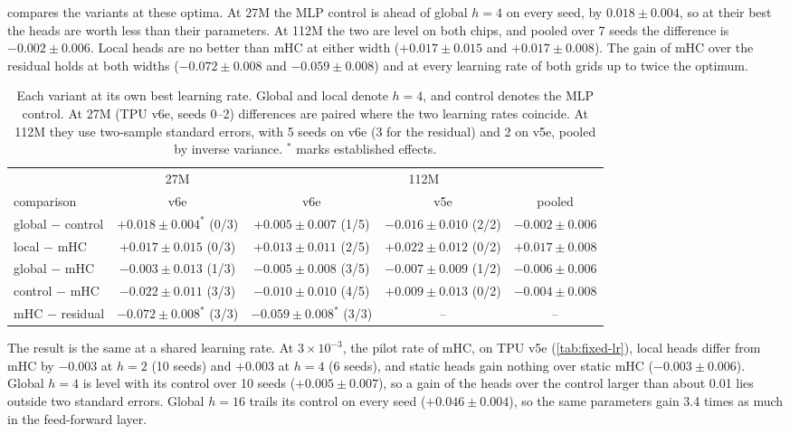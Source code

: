\documentclass[11pt, a4paper]{article}
\newcommand{\lr}[1]{\ensuremath{#1 \times 10^{-3}}}
\newcommand{\est}{^{\ast}}
\begin{document}
 compares the variants at these optima. At 27M the MLP control is ahead of global $h = 4$ on every seed, by
$0.018 \pm 0.004$, so at their best the heads are worth less than their parameters. At 112M the two are level on both chips, and
pooled over 7 seeds the difference is $-0.002 \pm 0.006$. Local heads are no better than mHC at either width ($+0.017 \pm 0.015$ and
$+0.017 \pm 0.008$). The gain of mHC over the residual holds at both widths ($-0.072 \pm 0.008$ and $-0.059 \pm 0.008$) and at every
learning rate of both grids up to twice the optimum.

\begin{table}[ht]
  \centering
  \caption{Each variant at its own best learning rate. Global and local denote $h = 4$, and control denotes the MLP control. At 27M
    (TPU v6e, seeds 0--2) differences are paired where the two learning rates coincide. At 112M they use two-sample standard errors,
    with 5 seeds on v6e (3 for the residual) and 2 on v5e, pooled by inverse variance. $\est$ marks established effects.}
  \label{tab:best-lr}
  \small
  \setlength{\tabcolsep}{4pt}
  \begin{tabular}{lcccc}
    \toprule
    & 27M & \multicolumn{3}{c}{112M} \\
    \cmidrule(lr){2-2} \cmidrule(lr){3-5}
    comparison & v6e & v6e & v5e & pooled \\
    \midrule
    global $-$ control & $+0.018 \pm 0.004\est$ (0/3) & $+0.005 \pm 0.007$ (1/5) & $-0.016 \pm 0.010$ (2/2) & $-0.002 \pm 0.006$ \\
    local $-$ mHC & $+0.017 \pm 0.015$ (0/3) & $+0.013 \pm 0.011$ (2/5) & $+0.022 \pm 0.012$ (0/2) & $+0.017 \pm 0.008$ \\
    global $-$ mHC & $-0.003 \pm 0.013$ (1/3) & $-0.005 \pm 0.008$ (3/5) & $-0.007 \pm 0.009$ (1/2) & $-0.006 \pm 0.006$ \\
    control $-$ mHC & $-0.022 \pm 0.011$ (3/3) & $-0.010 \pm 0.010$ (4/5) & $+0.009 \pm 0.013$ (0/2) & $-0.004 \pm 0.008$ \\
    mHC $-$ residual & $-0.072 \pm 0.008\est$ (3/3) & $-0.059 \pm 0.008\est$ (3/3) & -- & -- \\
    \bottomrule
  \end{tabular}
\end{table}

The result is the same at a shared learning rate. At \lr{3}, the pilot rate of mHC, on TPU v5e (\cref{tab:fixed-lr}), local heads
differ from mHC by $-0.003$ at $h = 2$ (10 seeds) and $+0.003$ at $h = 4$ (6 seeds), and static heads gain nothing over static
mHC ($-0.003 \pm 0.006$). Global $h = 4$ is level with its control over 10 seeds ($+0.005 \pm 0.007$), so a gain of the heads
over the control larger than about 0.01 lies outside two standard errors. Global $h = 16$ trails its control on every seed ($+0.046 \pm 0.004$), so the same parameters gain
3.4 times as much in the feed-forward layer.
\end{document}
